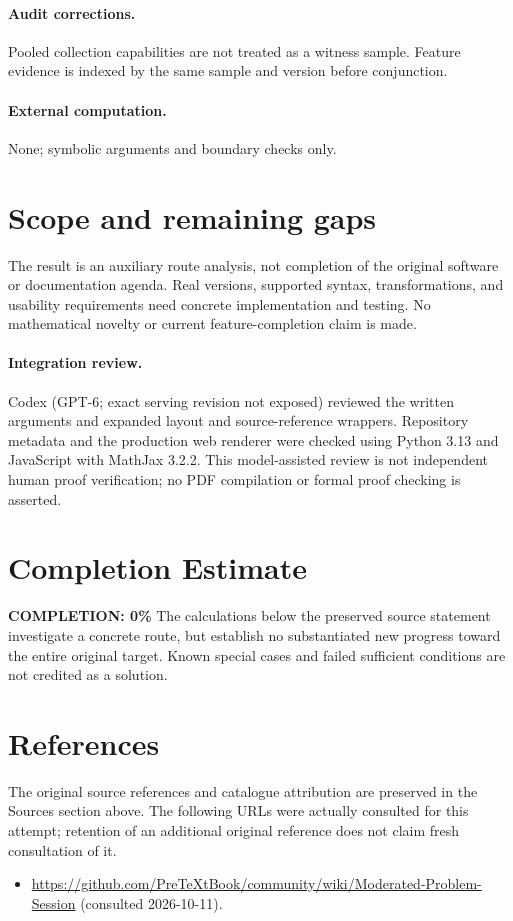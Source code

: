 \documentclass[11pt]{article}
\begin{document}
\paragraph{Audit corrections.} Pooled collection capabilities are not treated as a witness sample. Feature evidence is indexed by the same sample and version before conjunction.
\paragraph{External computation.} None; symbolic arguments and boundary checks only.
\section{Scope and remaining gaps}
The result is an auxiliary route analysis, not completion of the original software or documentation agenda. Real versions, supported syntax, transformations, and usability requirements need concrete implementation and testing. No mathematical novelty or current feature-completion claim is made.
\paragraph{Integration review.} Codex (GPT-6; exact serving revision not exposed) reviewed the written arguments and expanded layout and source-reference wrappers. Repository metadata and the production web renderer were checked using Python 3.13 and JavaScript with MathJax 3.2.2. This model-assisted review is not independent human proof verification; no PDF compilation or formal proof checking is asserted.

\section{Completion Estimate}
\noindent\textbf{COMPLETION: 0\%}
The calculations below the preserved source statement investigate a concrete route,
but establish no substantiated new progress toward the entire original target.
Known special cases and failed sufficient conditions are not credited as a solution.
\section{References}
The original source references and catalogue attribution are preserved in the
Sources section above. The following URLs were actually consulted for this attempt;
retention of an additional original reference does not claim fresh consultation of it.
\begin{itemize}
\item \url{https://github.com/PreTeXtBook/community/wiki/Moderated-Problem-Session} (consulted 2026-10-11). 
\end{itemize}
\end{document}
